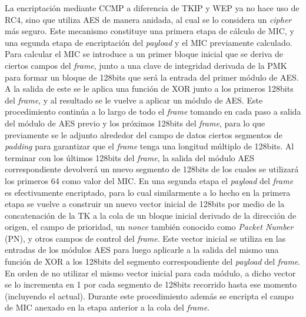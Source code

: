 \documentclass[10pt,a4paper]{article}
\begin{document}
La encriptación mediante CCMP a diferencia de TKIP y WEP ya no hace uso de RC4, sino que utiliza AES de manera anidada, al cual se lo considera un \textit{cipher} más seguro. Este mecanismo constituye una primera etapa de cálculo de MIC, y una segunda etapa de encriptación del \textit{payload} y el MIC previamente calculado. Para calcular el MIC se introduce a un primer bloque inicial que se deriva de ciertos campos del \textit{frame}, junto a una clave de integridad derivada de la PMK para formar un bloque de 128bits que será la entrada del primer módulo de AES. A la salida de este se le aplica una función de XOR junto a los primeros 128bits del \textit{frame}, y al resultado se le vuelve a aplicar un módulo de AES. Este procedimiento continúa a lo largo de todo el \textit{frame} tomando en cada paso a salida del módulo de AES previo y los próximos 128bits del \textit{frame}, para lo que previamente se le adjunto alrededor del campo de datos ciertos segmentos de \textit{padding} para garantizar que el \textit{frame} tenga una longitud múltiplo de 128bits. Al terminar con los últimos 128bits del \textit{frame}, la salida del módulo AES correspondiente devolverá un nuevo segmento de 128bits de los cuales se utilizará los primeros 64 como valor del MIC. En una segunda etapa el \textit{payload} del \textit{frame} es efectivamente encriptado, para lo cual similarmente a lo hecho en la primera etapa se vuelve a construir un nuevo vector inicial de 128bits por medio de la concatenación de la TK a la cola de un bloque inicial derivado de la dirección de origen, el campo de prioridad, un \textit{nonce} también conocido como \textit{Packet Number} (PN), y otros campos de control del \textit{frame}. Este vector inicial se utiliza en las entradas de los módulos AES para luego aplicarle a la salida del mismo una función de XOR a los 128bits del segmento correspondiente del \textit{payload} del \textit{frame}. En orden de no utilizar el mismo vector inicial para cada módulo, a dicho vector se lo incrementa en 1 por cada segmento de 128bits recorrido hasta ese momento (incluyendo el actual). Durante este procedimiento además se encripta el campo de MIC anexado en la etapa anterior a la cola del \textit{frame}.
\end{document}
